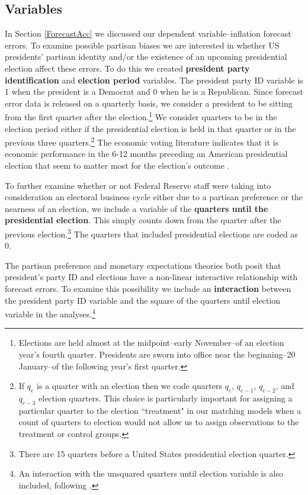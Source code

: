 \documentclass[a4paper]{article}\usepackage{graphicx, color}
\begin{document}
\subsection{Variables}

In Section \ref{ForecastAcc} we discussed our dependent variable--inflation forecast errors. To examine possible partisan biases we are interested in whether US presidents' partisan identity and/or the existence of an upcoming presidential election affect these errors. To do this we created {\bf{president party identification}} and {\bf{election period}} variables. The president party ID variable is 1 when the president is a Democrat and 0 when he is a Republican. Since forecast error data is released on a quarterly basis, we consider a president to be sitting from the first quarter after the election.\footnote{Elections are held almost at the midpoint--early November--of an election year's fourth quarter. Presidents are sworn into office near the beginning--20 January--of the following year's first quarter.} We consider quarters to be in the election period either if the presidential election is held in that quarter or in the previous three quarters.\footnote{If $q_{e}$ is a quarter with an election then we code quarters $q_{e}$, $q_{e-1}$, $q_{e-2}$, and $q_{e-3}$  election quarters. This choice is particularly important for assigning a particular quarter to the election ``treatment" in our matching models when a count of quarters to election would not allow us to assign observations to the treatment or control groups.} The economic voting literature indicates that it is economic performance in the 6-12 months preceding an American presidential election that seem to matter most for the election's outcome \citep[c.f][]{Gelman1993}. 

To further examine whether or not Federal Reserve staff were taking into consideration an electoral business cycle either due to a partisan preference or the nearness of an election, we include a variable of the {\bf{quarters until the presidential election}}. This simply counts down from the quarter after the previous election.\footnote{There are 15 quarters before a United States presidential election quarter.} The quarters that included presidential elections are coded as 0. 

The partisan preference and monetary expectations theories both posit that president's party ID and elections have a non-linear interactive relationship with forecast errors. To examine this possibility we include an \textbf{interaction} between the president party ID variable and the square of the quarters until election variable in the analyses.\footnote{An interaction with the unsquared quarters until election variable is also included, following \citep{Brambor2006}.}
\end{document}
